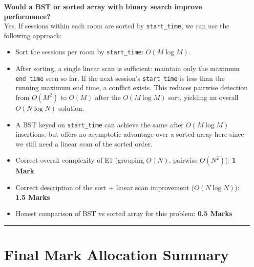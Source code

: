 \documentclass[11pt,a4paper]{article}
\newenvironment{markbox}[1]{%
    \begin{tcolorbox}[colback=markgreen!6!white, colframe=markgreen, title=\textbf{Mark Allocation --- #1}]
}{%
    \end{tcolorbox}
}
\begin{document}
\textbf{Would a BST or sorted array with binary search improve performance?} \\
Yes. If sessions within each room are sorted by \texttt{start\_time}, we can use the following approach:
\begin{itemize}
    \item Sort the sessions per room by \texttt{start\_time}: $O(M \log M)$.
    \item After sorting, a single linear scan is sufficient: maintain only the maximum \texttt{end\_time} seen so far. If the next session's \texttt{start\_time} is less than the running maximum end time, a conflict exists. This reduces pairwise detection from $O(M^2)$ to $O(M)$ after the $O(M \log M)$ sort, yielding an overall $O(N \log N)$ solution.
    \item A BST keyed on \texttt{start\_time} can achieve the same after $O(M \log M)$ insertions, but offers no asymptotic advantage over a sorted array here since we still need a linear scan of the sorted order.
\end{itemize}

\begin{markbox}{E3 --- 3 Marks}
\begin{itemize}
    \item Correct overall complexity of E1 (grouping $O(N)$, pairwise $O(N^2)$): \textbf{1 Mark}
    \item Correct description of the sort + linear scan improvement ($O(N \log N)$): \textbf{1.5 Marks}
    \item Honest comparison of BST vs sorted array for this problem: \textbf{0.5 Marks}
\end{itemize}
\end{markbox}

\vspace{0.5cm}
\hrule
\vspace{0.4cm}

\section*{Final Mark Allocation Summary}
\end{document}

